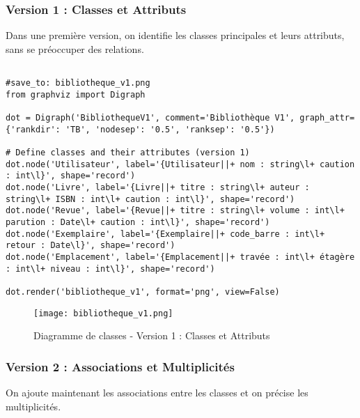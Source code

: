 \documentclass{article}
\begin{document}
\subsubsection{Version 1 : Classes et Attributs}

Dans une première version, on identifie les classes principales et leurs attributs, sans se préoccuper des relations.

\begin{verbatim}

#save_to: bibliotheque_v1.png
from graphviz import Digraph

dot = Digraph('BibliothequeV1', comment='Bibliothèque V1', graph_attr={'rankdir': 'TB', 'nodesep': '0.5', 'ranksep': '0.5'})

# Define classes and their attributes (version 1)
dot.node('Utilisateur', label='{Utilisateur||+ nom : string\l+ caution : int\l}', shape='record')
dot.node('Livre', label='{Livre||+ titre : string\l+ auteur : string\l+ ISBN : int\l+ caution : int\l}', shape='record')
dot.node('Revue', label='{Revue||+ titre : string\l+ volume : int\l+ parution : Date\l+ caution : int\l}', shape='record')
dot.node('Exemplaire', label='{Exemplaire||+ code_barre : int\l+ retour : Date\l}', shape='record')
dot.node('Emplacement', label='{Emplacement||+ travée : int\l+ étagère : int\l+ niveau : int\l}', shape='record')

dot.render('bibliotheque_v1', format='png', view=False)
\end{verbatim}

\begin{figure}[H]
    \centering
    \texttt{[image: bibliotheque\_v1.png]}
    \caption{Diagramme de classes - Version 1 : Classes et Attributs}
    \label{fig:bibliotheque_v1}
\end{figure}

\subsubsection{Version 2 : Associations et Multiplicités}

On ajoute maintenant les associations entre les classes et on précise les multiplicités.
\end{document}
